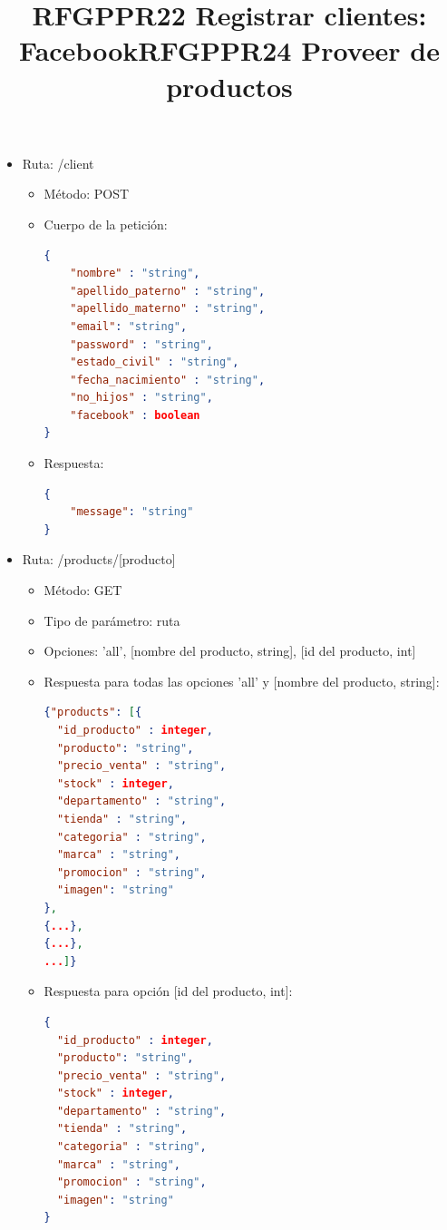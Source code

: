 \title{\textbf{RFGPPR22 Registrar clientes: Facebook}}
\begin{itemize}
\item Ruta: /client
\begin{itemize}
\item Método: POST
\item Cuerpo de la petición:
\begin{lstlisting}[language=json,firstnumber=1]
{
    "nombre" : "string",
	"apellido_paterno" : "string",
	"apellido_materno" : "string",
	"email": "string", 
	"password" : "string",
	"estado_civil" : "string",
	"fecha_nacimiento" : "string", 
	"no_hijos" : "string",
	"facebook" : boolean
}
\end{lstlisting}
\item Respuesta: 
\begin{lstlisting}[language=json,firstnumber=1]
{
    "message": "string"
}
\end{lstlisting}
\end{itemize}
\end{itemize}


\title{\textbf{RFGPPR24 Proveer de productos}}
\begin{itemize}
\item Ruta: /products/[producto]
\begin{itemize}
\item Método: GET
\item Tipo de parámetro: ruta
\item Opciones: 'all', [nombre del producto, string], [id del producto, int]
\item Respuesta para todas las opciones 'all' y [nombre del producto, string]: 

\begin{lstlisting}[language=json,firstnumber=1]
{"products": [{
  "id_producto" : integer,
  "producto": "string",
  "precio_venta" : "string",
  "stock" : integer,
  "departamento" : "string",
  "tienda" : "string",
  "categoria" : "string",
  "marca" : "string",
  "promocion" : "string",
  "imagen": "string"
},
{...},
{...},
...]}
\end{lstlisting}
\item Respuesta para opción [id del producto, int]:
\begin{lstlisting}[language=json,firstnumber=1]
{
  "id_producto" : integer,
  "producto": "string",
  "precio_venta" : "string",
  "stock" : integer,
  "departamento" : "string",
  "tienda" : "string",
  "categoria" : "string",
  "marca" : "string",
  "promocion" : "string",
  "imagen": "string"
}
\end{lstlisting}
\end{itemize}
\end{itemize}

